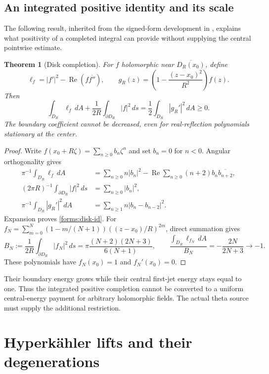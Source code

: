 \documentclass[11pt]{article}
\numberwithin{equation}{section}
\newtheorem{theorem}{Theorem}[section]
\theoremstyle{definition}
\theoremstyle{remark}
\begin{document}
\subsection{An integrated positive identity and its scale}
The following result, inherited from the signed-form development in
\cite{BakerTheta}, explains what positivity of a completed integral can
provide without supplying the central pointwise estimate.
\begin{theorem}[Disk completion]\label{forms:disk}
For $f$ holomorphic near $\overline{D_R(x_0)}$, define
\[
 \ell_f=|f'|^2-\operatorname{Re}(f\overline{f''}),\qquad
 g_R(z)=\left(1-\frac{(z-x_0)^2}{R^2}\right)f(z).
\]
Then
\begin{equation}\label{forms:disk-id}
 \int_{D_R}\ell_f\,dA+\frac1{2R}\int_{\partial D_R}|f|^2\,ds
 =\frac12\int_{D_R}|g_R'|^2\,dA\ge0.
\end{equation}
The boundary coefficient cannot be decreased, even for real-reflection
polynomials stationary at the center.
\end{theorem}
\begin{proof}
Write $f(x_0+R\zeta)=\sum_{n\ge0}b_n\zeta^n$ and set $b_n=0$ for
$n<0$.  Angular orthogonality gives
\begin{align*}
 \pi^{-1}\int_{D_R}\ell_f\,dA
 &=\sum_{n\ge0}n|b_n|^2-\operatorname{Re}
       \sum_{n\ge0}(n+2)b_n\overline{b_{n+2}},\\
 (2\pi R)^{-1}\int_{\partial D_R}|f|^2\,ds&=\sum_{n\ge0}|b_n|^2,\\
 \pi^{-1}\int_{D_R}|g_R'|^2\,dA&=\sum_{n\ge1}n|b_n-b_{n-2}|^2.
\end{align*}
Expansion proves \eqref{forms:disk-id}.  For
$f_N=\sum_{m=0}^N(1-m/(N+1))((z-x_0)/R)^{2m}$, direct summation gives
\[
 B_N:=\frac1{2R}\int_{\partial D_R}|f_N|^2\,ds
 =\pi\frac{(N+2)(2N+3)}{6(N+1)},\qquad
 \frac{\int_{D_R}\ell_{f_N}\,dA}{B_N}=-\frac{2N}{2N+3}\longrightarrow-1.
\]
These polynomials have $f_N(x_0)=1$ and $f_N'(x_0)=0$.
\end{proof}
Their boundary energy grows while their central first-jet energy stays
equal to one.  Thus the integrated positive completion cannot be
converted to a uniform central-energy payment for arbitrary holomorphic
fields.  The actual theta source must supply the additional restriction.

\section{Hyperk\"ahler lifts and their degenerations}\label{hk:section}
\end{document}
